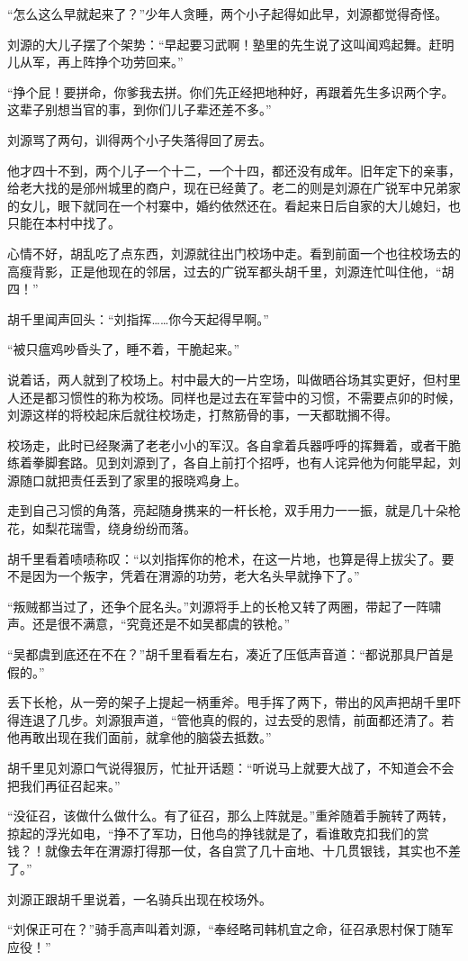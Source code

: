 “怎么这么早就起来了？”少年人贪睡，两个小子起得如此早，刘源都觉得奇怪。

刘源的大儿子摆了个架势：“早起要习武啊！塾里的先生说了这叫闻鸡起舞。赶明儿从军，再上阵挣个功劳回来。”

“挣个屁！要拼命，你爹我去拼。你们先正经把地种好，再跟着先生多识两个字。这辈子别想当官的事，到你们儿子辈还差不多。”

刘源骂了两句，训得两个小子失落得回了房去。

他才四十不到，两个儿子一个十二，一个十四，都还没有成年。旧年定下的亲事，给老大找的是邠州城里的商户，现在已经黄了。老二的则是刘源在广锐军中兄弟家的女儿，眼下就同在一个村寨中，婚约依然还在。看起来日后自家的大儿媳妇，也只能在本村中找了。

心情不好，胡乱吃了点东西，刘源就往出门校场中走。看到前面一个也往校场去的高瘦背影，正是他现在的邻居，过去的广锐军都头胡千里，刘源连忙叫住他，“胡四！”

胡千里闻声回头：“刘指挥……你今天起得早啊。”

“被只瘟鸡吵昏头了，睡不着，干脆起来。”

说着话，两人就到了校场上。村中最大的一片空场，叫做晒谷场其实更好，但村里人还是都习惯性的称为校场。同样也是过去在军营中的习惯，不需要点卯的时候，刘源这样的将校起床后就往校场走，打熬筋骨的事，一天都耽搁不得。

校场走，此时已经聚满了老老小小的军汉。各自拿着兵器呼呼的挥舞着，或者干脆练着拳脚套路。见到刘源到了，各自上前打个招呼，也有人诧异他为何能早起，刘源随口就把责任丢到了家里的报晓鸡身上。

走到自己习惯的角落，亮起随身携来的一杆长枪，双手用力一一振，就是几十朵枪花，如梨花瑞雪，绕身纷纷而落。

胡千里看着啧啧称叹：“以刘指挥你的枪术，在这一片地，也算是得上拔尖了。要不是因为一个叛字，凭着在渭源的功劳，老大名头早就挣下了。”

“叛贼都当过了，还争个屁名头。”刘源将手上的长枪又转了两圈，带起了一阵啸声。还是很不满意，“究竟还是不如吴都虞的铁枪。”

“吴都虞到底还在不在？”胡千里看看左右，凑近了压低声音道：“都说那具尸首是假的。”

丢下长枪，从一旁的架子上提起一柄重斧。甩手挥了两下，带出的风声把胡千里吓得连退了几步。刘源狠声道，“管他真的假的，过去受的恩情，前面都还清了。若他再敢出现在我们面前，就拿他的脑袋去抵数。”

胡千里见刘源口气说得狠厉，忙扯开话题：“听说马上就要大战了，不知道会不会把我们再征召起来。”

“没征召，该做什么做什么。有了征召，那么上阵就是。”重斧随着手腕转了两转，掠起的浮光如电，“挣不了军功，日他鸟的挣钱就是了，看谁敢克扣我们的赏钱？！就像去年在渭源打得那一仗，各自赏了几十亩地、十几贯银钱，其实也不差了。”

刘源正跟胡千里说着，一名骑兵出现在校场外。

“刘保正可在？”骑手高声叫着刘源，“奉经略司韩机宜之命，征召承恩村保丁随军应役！”

